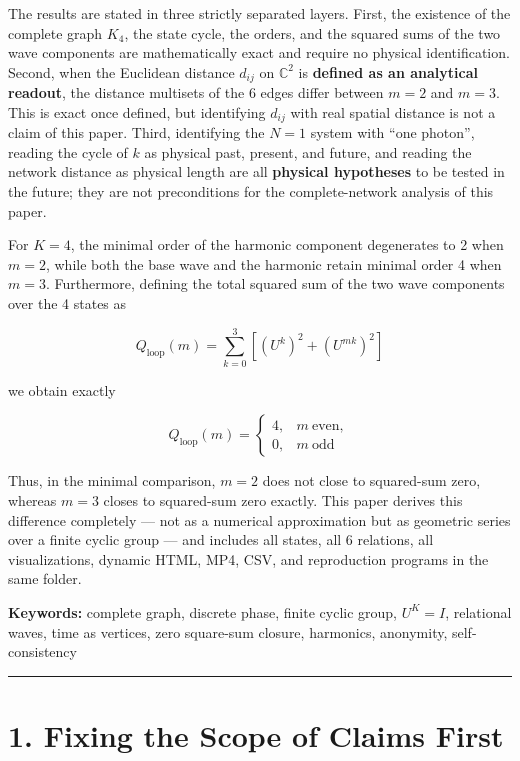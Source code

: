 \documentclass[
  a4paper,
]{article}
\begin{document}
The results are stated in three strictly separated layers. First, the
existence of the complete graph \(K_4\), the state cycle, the orders,
and the squared sums of the two wave components are mathematically exact
and require no physical identification. Second, when the Euclidean
distance \(d_{ij}\) on \(\mathbb C^2\) is \textbf{defined as an
analytical readout}, the distance multisets of the 6 edges differ
between \(m=2\) and \(m=3\). This is exact once defined, but identifying
\(d_{ij}\) with real spatial distance is not a claim of this paper.
Third, identifying the \(N=1\) system with ``one photon'', reading the
cycle of \(k\) as physical past, present, and future, and reading the
network distance as physical length are all \textbf{physical hypotheses}
to be tested in the future; they are not preconditions for the
complete-network analysis of this paper.

For \(K=4\), the minimal order of the harmonic component degenerates to
2 when \(m=2\), while both the base wave and the harmonic retain minimal
order 4 when \(m=3\). Furthermore, defining the total squared sum of the
two wave components over the 4 states as

\[
Q_{\mathrm{loop}}(m)
=
\sum_{k=0}^{3}\left[(U^k)^2+(U^{mk})^2\right]
\]

we obtain exactly

\[
Q_{\mathrm{loop}}(m)
=
\begin{cases}
4,&m\ \mathrm{even},\\
0,&m\ \mathrm{odd}
\end{cases}
\]

Thus, in the minimal comparison, \(m=2\) does not close to squared-sum
zero, whereas \(m=3\) closes to squared-sum zero exactly. This paper
derives this difference completely --- not as a numerical approximation
but as geometric series over a finite cyclic group --- and includes all
states, all 6 relations, all visualizations, dynamic HTML, MP4, CSV, and
reproduction programs in the same folder.

\textbf{Keywords:} complete graph, discrete phase, finite cyclic group,
\(U^K=I\), relational waves, time as vertices, zero square-sum closure,
harmonics, anonymity, self-consistency

\begin{center}\rule{0.5\linewidth}{0.5pt}\end{center}

\section{1. Fixing the Scope of Claims
First}\label{fixing-the-scope-of-claims-first}
\end{document}
